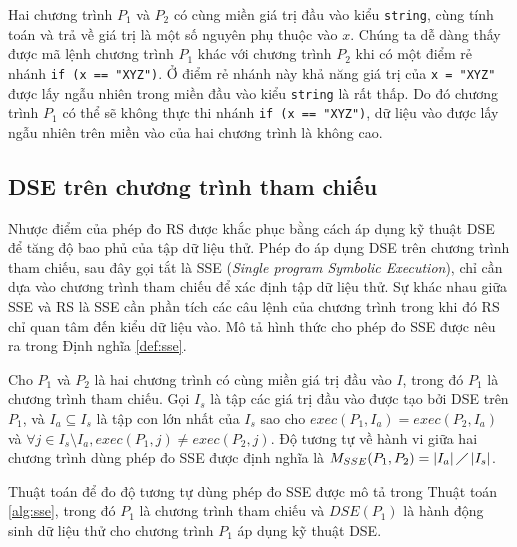 Hai chương trình $P_{1}$ và $P_{2}$ có cùng miền giá trị đầu vào 
kiểu \texttt{string}, cùng tính toán và trả về giá trị là một số 
nguyên phụ thuộc vào $ x $. Chúng ta dễ dàng thấy được mã lệnh 
chương trình $P_{1}$ khác với chương trình $P_{2}$ khi có một 
điểm rẻ nhánh \texttt{if (x == "XYZ")}. Ở điểm rẻ nhánh này khả 
năng giá trị của \texttt{x = "XYZ"} được lấy ngẫu nhiên trong miền 
đầu vào kiểu \texttt{string} là rất thấp. Do đó chương trình $P_{1}$ 
có thể sẽ không thực thi nhánh \texttt{if (x == "XYZ")}, dữ liệu vào 
được lấy ngẫu nhiên trên miền vào của hai chương trình là không cao.

\subsection{DSE trên chương trình tham chiếu}

Nhược điểm của phép đo RS được khắc phục bằng cách áp dụng kỹ thuật
DSE để tăng độ bao phủ của tập dữ liệu thử. Phép đo áp dụng DSE trên
chương trình tham chiếu, sau đây gọi tắt là SSE (\emph{Single program
  Symbolic Execution}), chỉ cần dựa vào chương trình tham chiếu để xác
định tập dữ liệu thử. Sự khác nhau giữa SSE và RS là SSE cần phần tích
các câu lệnh của chương trình trong khi đó RS chỉ quan tâm đến kiểu dữ
liệu vào. Mô tả hình thức cho phép đo SSE được nêu ra trong Định nghĩa
\ref{def:sse}.

\begin{definition}
  \label{def:sse}
  Cho $P_{1}$ và $P_{2}$ là hai chương trình có cùng miền giá trị đầu
  vào $I$, trong đó $P_{1}$ là chương trình tham chiếu. Gọi $I_{s}$ là
  tập các giá trị đầu vào được tạo bởi DSE trên $P_{1}$, và
  $I_{a} \subseteq I_s$ là tập con lớn nhất của $I_{s}$ sao cho
  $exec(P_{1}, I_a) = exec(P_{2}, I_a)$ và
  $\forall j \in I_{s} \setminus I_{a}, exec(P_{1}, j) \neq
  exec(P_{2}, j)$. Độ tương tự về hành vi giữa hai chương trình dùng
  phép đo SSE được định nghĩa là
  $M_{SSE}(P_{1}, P_{2}) = \left|I_{a}\right| \diagup
  \left|I_{s}\right| $.
\end{definition}

Thuật toán để đo độ tương tự dùng phép đo SSE được mô tả trong
Thuật toán \ref{alg:sse}, trong đó $P_1$ là chương trình tham chiếu và
$DSE(P_{1})$ là hành động sinh dữ liệu thử cho chương trình $P_1$ áp
dụng kỹ thuật DSE.

